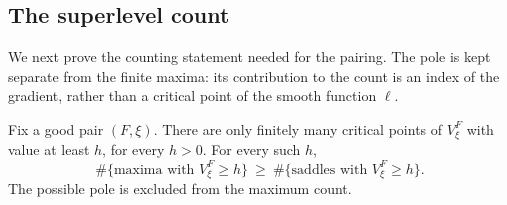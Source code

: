 \subsection{The superlevel count}

We next prove the counting statement needed for the pairing.  The pole is
kept separate from the finite maxima: its contribution to the count is an
index of the gradient, rather than a critical point of the smooth function
$\ell$.

\begin{lemma}
\label{lem:critical-count}
Fix a good pair $(F,\xi)$.  There are only finitely many critical points
of $V^F_\xi$ with value at least $h$, for every $h>0$.
For every such $h$,
\begin{equation}
 \#\{\text{maxima with }V^F_\xi\ge h\}
 \ \ge\
 \#\{\text{saddles with }V^F_\xi\ge h\}.
 \label{eq:cumulative-critical-count}
\end{equation}
The possible pole is excluded from the maximum count.
\end{lemma}

